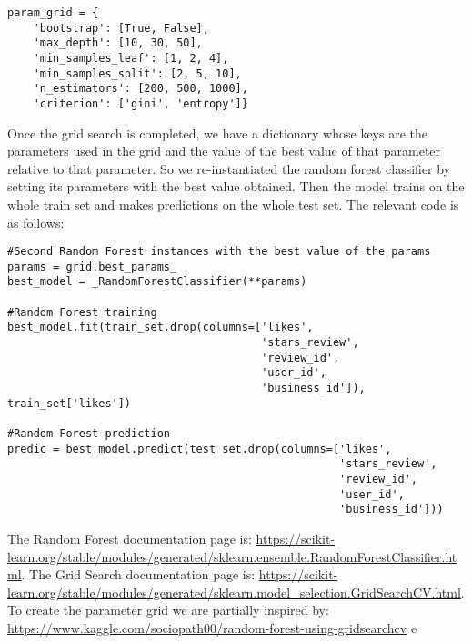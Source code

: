 \begin{lstlisting}
param_grid = {
    'bootstrap': [True, False],
    'max_depth': [10, 30, 50],
    'min_samples_leaf': [1, 2, 4],
    'min_samples_split': [2, 5, 10],
    'n_estimators': [200, 500, 1000],
    'criterion': ['gini', 'entropy']}
\end{lstlisting}
Once the grid search is completed, we have a dictionary whose keys are the parameters used in the grid and the value of the best value of that parameter relative to that parameter. So we re-instantiated the random forest classifier by setting its parameters with the best value obtained. Then the model trains on the whole train set and makes predictions on the whole test set. The relevant code is as follows:

\begin{lstlisting}
#Second Random Forest instances with the best value of the params
params = grid.best_params_
best_model = _RandomForestClassifier(**params)

#Random Forest training
best_model.fit(train_set.drop(columns=['likes', 
                                       'stars_review', 
                                       'review_id', 
                                       'user_id', 
                                       'business_id']), train_set['likes'])
                                       
#Random Forest prediction 
predic = best_model.predict(test_set.drop(columns=['likes', 
                                                   'stars_review', 
                                                   'review_id', 
                                                   'user_id', 
                                                   'business_id']))
\end{lstlisting}
The Random Forest documentation page is: \url{https://scikit-learn.org/stable/modules/generated/sklearn.ensemble.RandomForestClassifier.html}. The Grid Search documentation page is: \url{https://scikit-learn.org/stable/modules/generated/sklearn.model_selection.GridSearchCV.html}.\\
To create the parameter grid we are partially inspired by: \url{https://www.kaggle.com/sociopath00/random-forest-using-gridsearchcv} e \url{}


